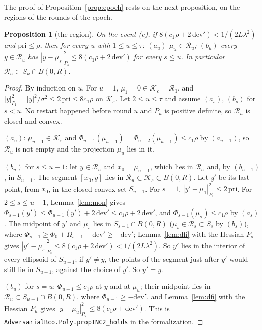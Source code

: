 \documentclass[11pt]{amsart}
\newtheorem{proposition}[theorem]{Proposition}
\theoremstyle{definition}
\numberwithin{equation}{section}
\newcommand{\cK}{\mathcal{K}}
\begin{document}
The proof of Proposition~\ref{prop:epoch} rests on the next proposition, on the regions of the rounds of the epoch.

\begin{proposition}[the region]\label{prop:inc2}
On the event (e), if $8(c_1\rho+2\,\mathrm{dev}')<1/(2L\lambda^2)$ and $\mathrm{pri}\le\rho$, then for every $u$ with $1\le u\le\tau$: $(a_u)$ $\mu_u\in\mathcal R_u$; $(b_u)$ every $y\in\mathcal R_u$ has $|y-\mu_s|^2_{P_s}\le8(c_1\rho+2\,\mathrm{dev}')$ for every $s\le u$. In particular $\mathcal R_u\subset S_u\cap B(0,R)$.
\end{proposition}

\begin{proof}
By induction on $u$. For $u=1$, $\mu_1=0\in\cK_\varepsilon=\mathcal R_1$, and $|y|^2_{P_1}=|y|^2/\sigma^2\le2\,\mathrm{pri}\le8c_1\rho$ on $\cK_\varepsilon$. Let $2\le u\le\tau$ and assume $(a_s)$, $(b_s)$ for $s<u$. No restart happened before round $u$ and $P_u$ is positive definite, so $\mathcal R_u$ is closed and convex.

$(a_u)$: $\mu_{u-1}\in\cK_\varepsilon$ and $\Phi_{u-1}(\mu_{u-1})=\Phi_{u-2}(\mu_{u-1})\le c_1\rho$ by $(a_{u-1})$, so $\mathcal R_u$ is not empty and the projection $\mu_u$ lies in it.

$(b_u)$ for $s\le u-1$: let $y\in\mathcal R_u$ and $x_0=\mu_{u-1}$, which lies in $\mathcal R_u$ and, by $(b_{u-1})$, in $S_{u-1}$. The segment $[x_0,y]$ lies in $\mathcal R_u\subset\cK_\varepsilon\subset B(0,R)$. Let $y'$ be its last point, from $x_0$, in the closed convex set $S_{u-1}$. For $s=1$, $|y'-\mu_1|^2_{P_1}\le2\,\mathrm{pri}$. For $2\le s\le u-1$, Lemma~\ref{lem:mon} gives $\Phi_{s-1}(y')\le\Phi_{u-1}(y')+2\,\mathrm{dev}'\le c_1\rho+2\,\mathrm{dev}'$, and $\Phi_{s-1}(\mu_s)\le c_1\rho$ by $(a_s)$. The midpoint of $y'$ and $\mu_s$ lies in $S_{s-1}\cap B(0,R)$ ($\mu_s\in\mathcal R_s\subset S_s$ by $(b_s)$), where $\Phi_{s-1}\ge\Phi_0+\Omega_{s-1}-\mathrm{dev}'\ge-\mathrm{dev}'$; Lemma~\ref{lem:dfi} with the Hessian $P_s$ gives $|y'-\mu_s|^2_{P_s}\le8(c_1\rho+2\,\mathrm{dev}')<1/(2L\lambda^2)$. So $y'$ lies in the interior of every ellipsoid of $S_{u-1}$; if $y'\ne y$, the points of the segment just after $y'$ would still lie in $S_{u-1}$, against the choice of $y'$. So $y'=y$.

$(b_u)$ for $s=u$: $\Phi_{u-1}\le c_1\rho$ at $y$ and at $\mu_u$; their midpoint lies in $\mathcal R_u\subset S_{u-1}\cap B(0,R)$, where $\Phi_{u-1}\ge-\mathrm{dev}'$, and Lemma~\ref{lem:dfi} with the Hessian $P_u$ gives $|y-\mu_u|^2_{P_u}\le8(c_1\rho+\mathrm{dev}')$.
This is \texttt{AdversarialBco.Poly.propINC2\_holds} in the formalization.
\end{proof}
\end{document}
